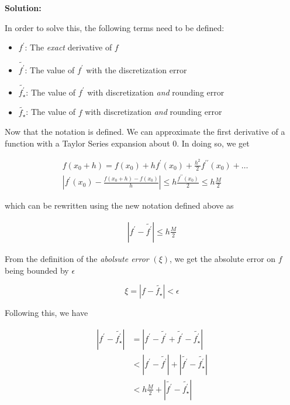 \documentclass[12pt]{article}
\begin{document}
\begin{enumerate}
\begin{enumerate}
{\bf Solution:}

In order to solve this, the following terms need to be defined:

\begin{itemize}
\item $f^{\prime}$: The {\em exact} derivative of $f$
\item $\widetilde{f^{\prime}}$: The value of $f^{\prime}$ with the discretization error
\item $\widetilde{f^{\prime}_{\star}}$: The value of $f^{\prime}$ with discretization {\em and} rounding error
\item $\widetilde{f_{\star}}$: The value of $f$ with discretization {\em and} rounding error
\end{itemize}

Now that the notation is defined. We can approximate the first derivative of a
function with a Taylor Series expansion about 0. In doing so, we get

\begin{align*}
&f\left(x_{0} + h\right)  = f\left(x_{0}\right) + hf^{\prime}\left(x_{0}\right) + \frac{h^{2}}{2}f^{\prime \prime}\left(x_{0}\right) + \ldots\\
&\left| f^{\prime}\left(x_{0}\right) - \frac{f\left(x_{0}+h\right) - f\left(x_{0}\right)}{h}\right| \leq h\frac{f^{\prime\prime}\left(x_{0}\right)}{2} \leq h\frac{M}{2}
\end{align*}

which can be rewritten using the new notation defined above as

\begin{align*}
\left| f^{\prime} - \widetilde{f^{\prime}} \right| \leq h\frac{M}{2}
\end{align*}

From the definition of the {\em abolsute error} $(\xi)$, we get the absolute error on $f$ being bounded by $\epsilon$

\[
\xi = \left| f - \widetilde{f_{\star}} \right| < \epsilon
\]

Following this, we have

\begin{align*}
\left| f^{\prime} - \widetilde{f^{\prime}_{\star}} \right| &= \left| f^{\prime} - \widetilde{f^{\prime}} + \widetilde{f^{\prime}} -\widetilde{f^{\prime}_{\star}} \right|\\
&< \left| f^{\prime} - \widetilde{f^{\prime}} \right| + \left| \widetilde{f^{\prime}} - \widetilde{f^{\prime}_{\star}} \right|\\
&< h\frac{M}{2} + \left| \widetilde{f^{\prime}} - \widetilde{f^{\prime}_{\star}} \right|
\end{align*}


\end{enumerate}
\end{enumerate}
\end{document}

